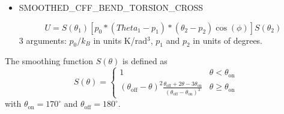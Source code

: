 \begin{itemize}
\item{SMOOTHED\_CFF\_BEND\_TORSION\_CROSS}

\begin{equation}
 U=S\left(\theta_1\right) 
 \left[
 p_0*(Theta_1-p_1)*(\theta_2-p_2)\cos(\phi)
\right]
S\left(\theta_2\right)
\end{equation}
  3 arguments: $p_0/k_B$ in units K/rad$^3$, $p_1$ and $p_2$ in units of degrees.
\end{itemize}


\noindent The smoothing function $S\left(\theta\right)$ is defined as
\begin{equation}
 S\left(\theta\right)=\begin{cases}
  1 & \theta<\theta_{\text{on}}\\
  \left(\theta_{\text{off}}-\theta\right)^2 
       \frac{\theta_{\text{off}}+2\theta-3\theta_{\text{on}}}
       {\left(\theta_{\text{off}}-\theta_{\text{on}}\right)^3}& \theta\geq\theta_{\text{on}}
  \end{cases}
\end{equation}
with $\theta_{\text{on}}=170^\circ$ and $\theta_{\text{off}}=180^\circ$.





